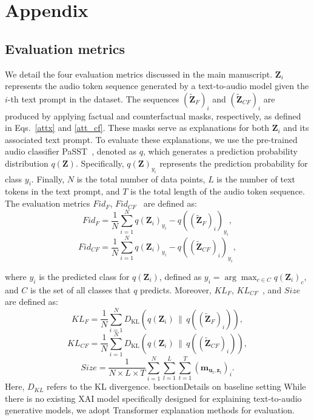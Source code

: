 \clearpage
\section{Appendix}

\subsection{Evaluation metrics}
We detail the four evaluation metrics discussed in the main manuscript. $\textbf{Z}_i$ represents the audio token sequence generated by a text-to-audio model given the $i$-th text prompt in the dataset. The sequences $(\tilde{\textbf{Z}}_{F})_{i}$ and $(\tilde{\textbf{Z}}_{CF})_{i}$ are produced by applying factual and counterfactual masks, respectively, as defined in Eqs.~\eqref{attx} and \eqref{att_cf}. These masks serve as explanations for both $\textbf{Z}_i$ and its associated text prompt.
To evaluate these explanations, we use the pre-trained audio classifier PaSST~\cite{koutini2021efficient}, denoted as $q$, which generates a prediction probability distribution $q(\textbf{Z})$. Specifically, $q(\textbf{Z})_{y_i}$ represents the prediction probability for class $y_i$. Finally, $N$ is the total number of data points, $L$ is the number of text tokens in the text prompt, and $T$ is the total length of the audio token sequence. The evaluation metrics $Fid_{F}$, $Fid_{CF}$~\cite{yuan2021explainability, yuan2022explainability, ali2023explainable} are defined as:
\begin{equation}
Fid_{F} =  \frac{1}{N}\sum^{N}_{i=1}q(\textbf{Z}_{i})_{y_i} - q((\tilde{\textbf{Z}}_{F})_i)_{y_i},
\end{equation}
\begin{equation}
Fid_{CF} =  \frac{1}{N}\sum^{N}_{i=1}q(\textbf{Z}_i)_{y_i} - q((\tilde{\textbf{Z}}_{CF})_i)_{y_i},
\end{equation}

\noindent where $y_i$ is the predicted class for $q(\textbf{Z}_{i})$, defined as $y_i = \arg\max_{c \in C} q(\textbf{Z}_{i})_c$, and $C$ is the set of all classes that $q$ predicts. Moreover, $KL_{F}$, $KL_{CF}$~\cite{kreuk2022audiogen, yang2023diffsound, huang2023make}, and $Size$ are defined as:
\begin{equation}
KL_{F} = \frac{1}{N}\sum^{N}_{i=1} D_{\text{KL}} \left( q(\textbf{Z}_{i}) \, \| \, q((\tilde{\textbf{Z}}_{F})_i) \right),
\end{equation}
\begin{equation}
KL_{CF} = \frac{1}{N}\sum^{N}_{i=1}D_{\text{KL}} \left( q(\textbf{Z}_i) \, \| \, q((\tilde{\textbf{Z}}_{CF})_i) \right),
\end{equation}
\begin{equation}
    Size = \frac{1}{N \times L \times T} \sum_{i=1}^{N} \sum_{l=1}^{L} \sum_{t=1}^{T} (\textbf{m}_{\textbf{u}_{l}, \textbf{z}_{t}})_{i}.
\end{equation}
Here, $D_{KL}$ refers to the KL divergence.
bsection{Details on baseline setting}
While there is no existing XAI model specifically designed for explaining text-to-audio generative models, we adopt Transformer explanation methods for evaluation.

